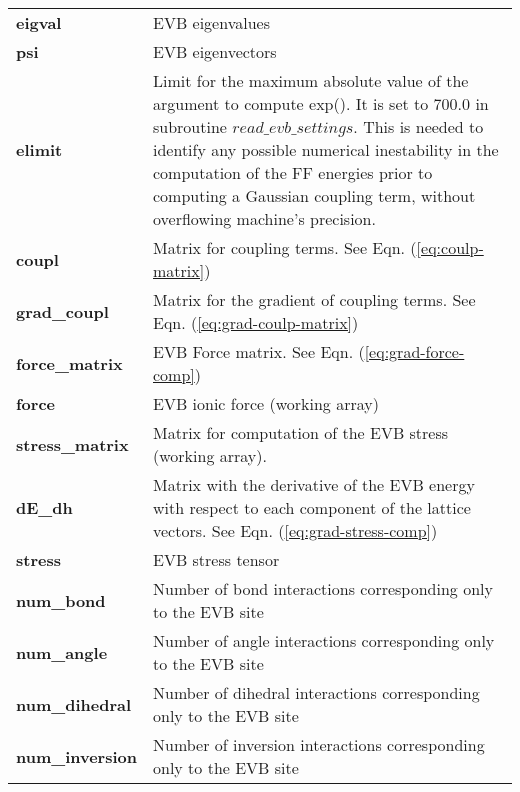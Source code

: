 \begin{center}
\begin{longtable*}[t]{p{0.15\textwidth}|p{0.85\textwidth}}
{\bf   eigval} & EVB eigenvalues\\

{\bf  psi} & EVB eigenvectors\\

{\bf elimit} & Limit for the maximum absolute value of the argument to compute exp(). It is set to 700.0 in subroutine $read\_evb\_settings$. This is needed to identify any possible numerical inestability in the computation of the FF energies prior to computing a Gaussian coupling term, without overflowing machine's precision. \\	

{\bf coupl} &       Matrix for coupling terms. See Eqn. (\ref{eq:coulp-matrix})\\

{\bf grad\_coupl} &      Matrix for the gradient of coupling terms. See Eqn. (\ref{eq:grad-coulp-matrix})\\

{\bf  force\_matrix} & EVB Force matrix. See Eqn. (\ref{eq:grad-force-comp})\\

{\bf force} & EVB ionic force (working array)\\

{\bf  stress\_matrix} & Matrix for computation of the EVB stress (working array). \\

{\bf  dE\_dh } & Matrix with the derivative of the EVB energy with respect to each component of the lattice vectors. See Eqn. (\ref{eq:grad-stress-comp})\\

{\bf  stress} & EVB stress tensor \\

{\bf  num\_bond} & Number of bond interactions corresponding only to the EVB site\\
{\bf  num\_angle} & Number of angle interactions corresponding only to the EVB site\\
{\bf  num\_dihedral} & Number of dihedral interactions corresponding only to the EVB site\\
{\bf  num\_inversion} & Number of inversion interactions corresponding only to the EVB site\\


\end{longtable*}
\end{center}
